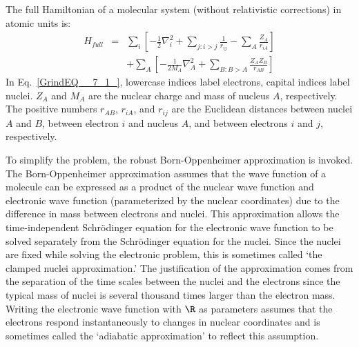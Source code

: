 \documentclass[11pt,oneside,final]{huthesis}%
\begin{document}
The full Hamiltonian of a molecular system (without relativistic corrections) in atomic units is: 
\begin{eqnarray} \label{GrindEQ__7_1_} 
	H_{{full}}  & = &\sum_{i}\left[ -\frac{1}{2}\nabla_{i}^{2} +\sum_{j:i>j} \frac{1}{r_{ij}}-\sum _{A} \frac{Z_{A} }{r_{iA} } \right]\\
	&&+\sum_A\left[  -\frac{1}{2M_{A} } \nabla_{A}^{2} +\sum_{B:B>A} \frac{Z_{A} Z_{B} }{r_{AB} } \right] \nonumber
\end{eqnarray} 
In Eq.~\eqref{GrindEQ__7_1_}, lowercase indices label electrons, capital indices label nuclei. $Z_A$ and $M_A$ are the nuclear charge and mass of nucleus $A$, respectively. The positive numbers $r_{AB}$, $r_{iA}$, and  $r_{ij}$ are the Euclidean distances between nuclei $A$ and $B$, between electron $i$ and nucleus $A$, and between electrons $i$ and $j$, respectively. 

To simplify the problem, the robust Born-Oppenheimer approximation is invoked. The Born-Oppenheimer approximation assumes that the wave function of a molecule can be expressed as a product of the nuclear wave function and electronic wave function (parameterized by the nuclear coordinates) due to the difference in mass between electrons and nuclei.  This approximation allows the time-independent Schr\"odinger equation for the electronic wave function to be solved separately from the Schr\"odinger equation for the nuclei.  Since the nuclei are fixed while solving the electronic problem, this is sometimes called `the clamped nuclei approximation.'  The justification of the approximation comes from the separation of the time scales between the nuclei and the electrons since the typical mass of nuclei is several thousand times larger than the electron mass.  Writing the electronic wave function with $\R$ as parameters assumes that the electrons respond instantaneously to changes in nuclear coordinates and is sometimes called the `adiabatic approximation' to reflect this assumption.

\end{document}
